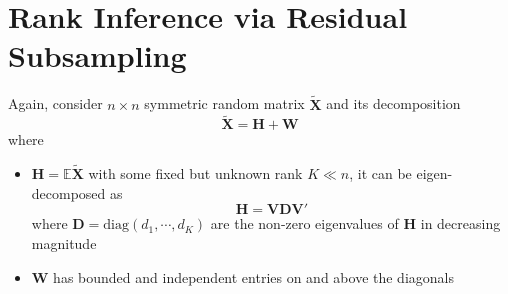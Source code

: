 \documentclass[twoside]{article}
\begin{document}
\section{Rank Inference via Residual Subsampling}
Again, consider $n\times n$ symmetric random matrix $\tilde{\mathbf{X}}$ and its decomposition 
\begin{equation*}
    \tilde{\mathbf{X}} = \mathbf{H+W}
\end{equation*}
where
\begin{itemize}
    \item $\mathbf{H} = \mathbb{E}\tilde{\mathbf{X}}$ with some fixed but unknown rank $K \ll n$, it can be eigen-decomposed as $$ \mathbf{H} = \mathbf{VDV}' $$ where $\mathbf{D} = \mathrm{diag}(d_1,\cdots,d_K)$ are the non-zero eigenvalues of $\mathbf{H}$ in decreasing magnitude 
    \item $\mathbf{W}$ has bounded and independent entries on and above the diagonals
\end{itemize}

\newpage


\end{document}
